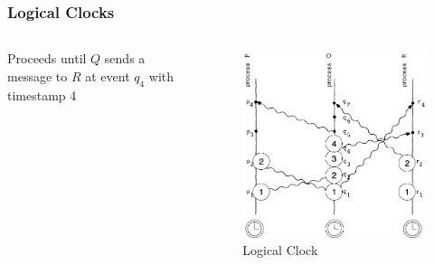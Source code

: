 \documentclass{beamer}
\begin{document}
\frame
{
	\frametitle{Logical Clocks}

	\begin{columns}
	\begin{column}{0.6\textwidth}

		Proceeds until $Q$ sends a message to $R$ at event $q_4$ with timestamp 4


	\end{column}
	\begin{column}{0.4\textwidth}

		\begin{figure}[ht!]
		\includegraphics[width=\textwidth]{files/ClockDist-Impl-Logical-Clock-3.png}
		\caption{Logical Clock}
		\end{figure}


	\end{column}
	\end{columns}


}
\end{document}
